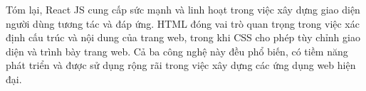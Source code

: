 \documentclass[../Thesis.tex]{subfiles}
\begin{document}
		Tóm lại, React JS cung cấp sức mạnh và linh hoạt trong việc xây dựng giao diện người dùng tương tác và đáp ứng. HTML đóng vai trò quan trọng trong việc xác định cấu trúc và nội dung của trang web, trong khi CSS cho phép tùy chỉnh giao diện và trình bày trang web. Cả ba công nghệ này đều phổ biến, có tiềm năng phát triển và được sử dụng rộng rãi trong việc xây dựng các ứng dụng web hiện đại.
\end{document}

